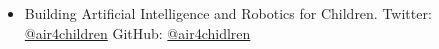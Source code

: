 \documentclass{mycv}
\begin{document}
\begin{itemize}
\item Building Artificial Intelligence and Robotics for Children. 
Twitter: \href{https://twitter.com/air4children}{\faTwitter @air4children} 
GitHub: \href{https://github.com/air4children}{\faGithub* @air4chidlren} 



\end{itemize}




\end{document}
